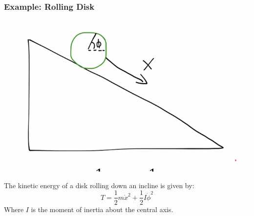 \documentclass[../PHYS306Notes.tex]{subfiles}
\begin{document}
\subsubsection{Example: Rolling Disk}
\begin{center}
    \includegraphics[scale=0.5]{Lecture-17/l17-img4.png}
\end{center}
The kinetic energy of a disk rolling down an incline is given by:
\[T = \frac{1}{2}m\dot{x}^2 + \frac{1}{2}I\dot{\phi}^2\]
Where $I$ is the moment of inertia about the central axis.
\end{document}
